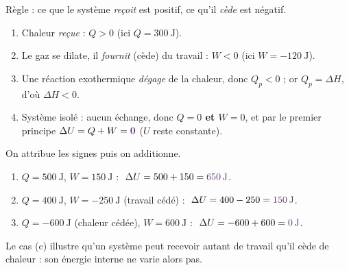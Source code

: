 \documentclass[11pt,a4paper]{article}
\newcommand{\dH}{\Delta H}
\newcommand{\dU}{\Delta U}
\newcommand{\rep}[1]{\textcolor{primarydark}{\textbf{#1}}}
\begin{document}
\begin{center}
\end{center}

\begin{correction}
Règle : ce que le système \emph{reçoit} est positif, ce qu'il \emph{cède} est négatif.
\begin{enumerate}[label=\alph*),leftmargin=2em,topsep=2pt,itemsep=2pt]
  \item Chaleur \emph{reçue} : \rep{$Q>0$} (ici $Q=\SI{+300}{\joule}$).
  \item Le gaz se dilate, il \emph{fournit} (cède) du travail : \rep{$W<0$} (ici $W=\SI{-120}{\joule}$).
  \item Une réaction exothermique \emph{dégage} de la chaleur, donc $Q_p<0$ ; or $Q_p=\dH$, d'où \rep{$\dH<0$}.
  \item Système isolé : aucun échange, donc \rep{$Q=0$ et $W=0$}, et par le premier principe
        $\dU = Q+W = \rep{0}$ ($U$ reste constante).
\end{enumerate}
\end{correction}

\begin{correction}[appliquer $\dU = Q + W$]
On attribue les signes puis on additionne.
\begin{enumerate}[label=\alph*),leftmargin=2em,topsep=2pt,itemsep=3pt]
  \item $Q=\SI{+500}{\joule}$, $W=\SI{+150}{\joule}$ : $\;\dU = 500 + 150 = \rep{\SI{+650}{\joule}}$.
  \item $Q=\SI{+400}{\joule}$, $W=\SI{-250}{\joule}$ (travail cédé) : $\;\dU = 400 - 250 = \rep{\SI{+150}{\joule}}$.
  \item $Q=\SI{-600}{\joule}$ (chaleur cédée), $W=\SI{+600}{\joule}$ : $\;\dU = -600 + 600 = \rep{\SI{0}{\joule}}$.
\end{enumerate}
Le cas (c) illustre qu'un système peut recevoir autant de travail qu'il cède de chaleur : son énergie
interne ne varie alors pas.
\end{correction}
\end{document}
